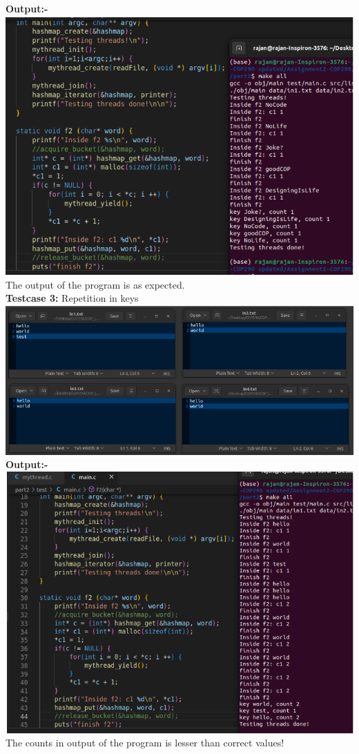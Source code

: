 \documentclass[12pt]{article}
\begin{document}
\begin{spacing}{1.2}
\textbf{Output:-}\\
\includegraphics[width=14cm]{images/21.png}\\
The output of the program is as expected.\\
    \newpage
\textbf{Testcase 3:}  Repetition in keys\\
\includegraphics[width=14cm]{images/22.png}\\
\textbf{Output:-}\\
\includegraphics[width=14cm]{images/23.png}\\
The counts in output of the program is lesser than correct values!\\
    \newpage


\end{spacing}
\end{document}
